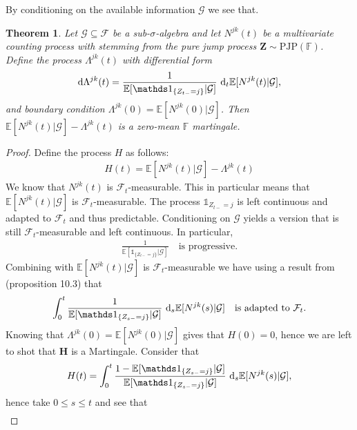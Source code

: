 \documentclass[12pt,letter,twoside]{article}
\theoremstyle{plain}
\newtheorem{theorem}{Theorem}
\theoremstyle{definition}
\theoremstyle{remark}
\begin{document}
By conditioning on the available information $\mathcal G$ we see that.
\begin{theorem}
Let $\mathcal G\subseteq \mathcal F$ be a sub-$\sigma$-algebra and let $N^{jk}(t)$ be a multivariate counting process with stemming from the pure jump process $\mathbf Z\sim \text{PJP}(\mathbb F)$. Define the process $\Lambda^{jk}(t)$ with differential form
\begin{align}
\text d\Lambda^{jk}(t)=\frac{1}{\mathbb E[\mathds 1_{\{Z_{t-}=j\}}\vert \mathcal G]}\ \text d_t\mathbb E[N^{jk}(t)\vert \mathcal G],
\end{align}
and boundary condition $\Lambda^{jk}(0)=\mathbb E[N^{jk}(0)\vert \mathcal G]$. Then $\mathbb E[N^{jk}(t)\vert \mathcal G]-\Lambda^{jk}(t)$ is a zero-mean $\mathbb F$ martingale.
\end{theorem}
\begin{proof}
Define the process $H$ as follows:
\begin{align}
H(t)=\mathbb E[N^{jk}(t)\vert \mathcal G]-\Lambda^{jk}(t)
\end{align}
We know that $N^{jk}(t)$ is $\mathcal F_t$-measurable. This in particular means that $\mathbb E[N^{jk}(t)\vert \mathcal G]$ is $\mathcal F_t$-measurable. The process $\mathds 1_{Z_{t-}=j}$ is left continuous and adapted to $\mathcal F_t$ and thus predictable. Conditioning on $\mathcal G$ yields a version that is still $\mathcal F_t$-measurable and left continuous. In particular,
\begin{align}
    \frac{1}{\mathbb E[\mathds 1_{\{Z_{t-}=j\}}\vert \mathcal G]}\quad \text{is progressive.}
\end{align}
Combining with $\mathbb E[N^{jk}(t)\vert \mathcal G]$ is $\mathcal F_t$-measurable we have using a result from \cite{lund2022} (proposition 10.3) that
\begin{align}
    \int_0^t\frac{1}{\mathbb E[\mathds 1_{\{Z_{s-}=j\}}\vert \mathcal G]}\ \text d_s\mathbb E[N^{jk}(s)\vert \mathcal G] \quad \text{is adapted to $\mathcal F_t$.}
\end{align}
Knowing that $\Lambda^{jk}(0)=\mathbb E[N^{jk}(0)\vert \mathcal G]$ gives that $H(0)=0$, hence we are left to shot that $\mathbf H$ is a Martingale. Consider that
\begin{align}
H(t)=\int_0^t\frac{1-\mathbb E[\mathds 1_{\{Z_{s-}=j\}}\vert \mathcal G]}{\mathbb E[\mathds 1_{\{Z_{s-}=j\}}\vert \mathcal G]}\ \text d_s\mathbb E[N^{jk}(s)\vert \mathcal G],
\end{align}
hence take $0\le s\le t$ and see that
\begin{align}

\end{align}
\end{proof}
\end{document}
